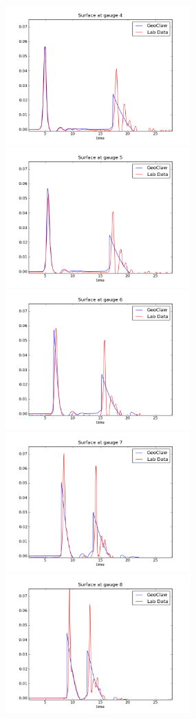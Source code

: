 \begin{figure}[ht]
\hfil\includegraphics[width=2.8in]{bp5/CaseB/gauge0004fig300.png}\hfil
\hfil\includegraphics[width=2.8in]{bp5/CaseB/gauge0005fig300.png}\hfil
\vskip 5pt
\hfil\includegraphics[width=2.8in]{bp5/CaseB/gauge0006fig300.png}\hfil
\hfil\includegraphics[width=2.8in]{bp5/CaseB/gauge0007fig300.png}\hfil
\vskip 5pt
\hfil\includegraphics[width=2.8in]{bp5/CaseB/gauge0008fig300.png}\hfil

\end{figure}
